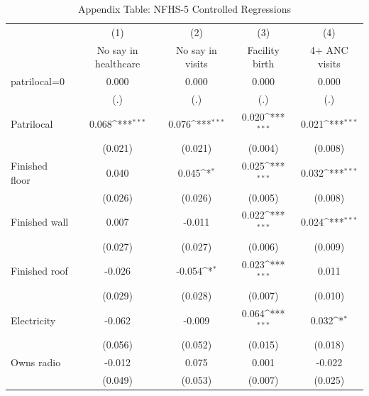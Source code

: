 \begin{table}[htbp]\centering
\def\sym#1{\ifmmode^{#1}\else\(^{#1}\)\fi}
\caption{Appendix Table: NFHS-5 Controlled Regressions}
\begin{tabular}{l*{4}{c}}
\hline\hline
                    &\multicolumn{1}{c}{(1)}&\multicolumn{1}{c}{(2)}&\multicolumn{1}{c}{(3)}&\multicolumn{1}{c}{(4)}\\
                    &\multicolumn{1}{c}{No say in healthcare}&\multicolumn{1}{c}{No say in visits}&\multicolumn{1}{c}{Facility birth}&\multicolumn{1}{c}{4+ ANC visits}\\
\hline
patrilocal=0        &       0.000         &       0.000         &       0.000         &       0.000         \\
                    &         (.)         &         (.)         &         (.)         &         (.)         \\
Patrilocal          &       0.068\sym{***}&       0.076\sym{***}&       0.020\sym{***}&       0.021\sym{***}\\
                    &     (0.021)         &     (0.021)         &     (0.004)         &     (0.008)         \\
Finished floor      &       0.040         &       0.045\sym{*}  &       0.025\sym{***}&       0.032\sym{***}\\
                    &     (0.026)         &     (0.026)         &     (0.005)         &     (0.008)         \\
Finished wall       &       0.007         &      -0.011         &       0.022\sym{***}&       0.024\sym{***}\\
                    &     (0.027)         &     (0.027)         &     (0.006)         &     (0.009)         \\
Finished roof       &      -0.026         &      -0.054\sym{*}  &       0.023\sym{***}&       0.011         \\
                    &     (0.029)         &     (0.028)         &     (0.007)         &     (0.010)         \\
Electricity         &      -0.062         &      -0.009         &       0.064\sym{***}&       0.032\sym{*}  \\
                    &     (0.056)         &     (0.052)         &     (0.015)         &     (0.018)         \\
Owns radio          &      -0.012         &       0.075         &       0.001         &      -0.022         \\
                    &     (0.049)         &     (0.053)         &     (0.007)         &     (0.025)         \\

\end{tabular}
\end{table}
